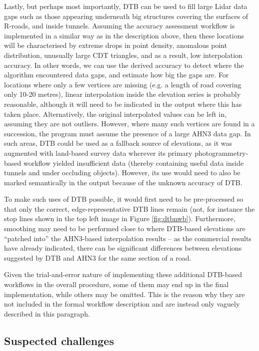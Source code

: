 Lastly, but perhaps most importantly, DTB can be used to fill large Lidar data gaps such as those appearing underneath big structures covering the surfaces of R-roads, and inside tunnels. Assuming the accuracy assessment workflow is implemented in a similar way as in the description above, then these locations will be characterised by extreme drops in point density, anomalous point distribution, unusually large CDT triangles, and as a result, low interpolation accuracy. In other words, we can use the derived accuracy to detect  where the algorithm encountered data gaps, and estimate how big the gaps are. For locations where only a few vertices are missing (e.g. a length of road covering only 10-20 metres), linear interpolation inside the elevation series is probably reasonable, although it will need to be indicated in the output where this has taken place. Alternatively, the original interpolated values can be left in, assuming they are not outliers. However, where many such vertices are found in a succession, the program must assume the presence of a large AHN3 data gap. In such areas, DTB could be used as a fallback source of elevations, as it was augmented with land-based survey data wherever its primary photogrammetry-based workflow yielded insufficient data (thereby containing useful data inside tunnels and under occluding objects). However, its use would need to also be marked semantically in the output because of the unknown accuracy of DTB.

To make such uses of DTB possible, it would first need to be pre-processed so that only the correct, edge-representative DTB lines remain (not, for instance the stop lines shown in the top left image in Figure \ref{fig:dtbnwb}). Furthermore, smoothing may need to be performed close to where DTB-based elevations are “patched into” the AHN3-based interpolation results – as the commercial results have already indicated, there can be significant differences between elevations suggested by DTB and AHN3 for the same section of a road. 

Given the trial-and-error nature of implementing these additional DTB-based workflows in the overall procedure, some of them may end up in the final implementation, while others may be omitted. This is the reason why they are not included in the formal workflow description and are instead only vaguely described in this paragraph.

\subsection{Suspected challenges}
\label{sub:suspectedchallenges}

